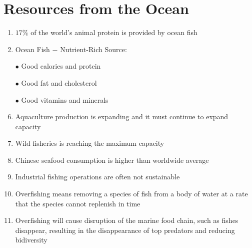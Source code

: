 \documentclass{report}
\begin{document}
\section{Resources from the Ocean}
\begin{enumerate}
    \item $17\%$ of the world's animal protein is provided by ocean fish
    \item Ocean Fish $-$ Nutrient-Rich Source:
    \item [$\bullet$]Good calories and protein
    \item [$\bullet$]Good fat and cholesterol
    \item [$\bullet$]Good vitamins and minerals
    \item Aquaculture production is expanding and it must continue to expand capacity
    \item Wild fisheries is reaching the maximum capacity
    \item Chinese seafood consumption is higher than worldwide average
    \item Industrial fishing operations are often not sustainable
    \item Overfishing means removing a species of fish from a body of water at a rate that the species cannot replenish in time
    \item Overfishing will cause disruption of the marine food chain, such as fishes disappear, resulting in the disappearance of top predators and reducing bidiversity
\end{enumerate}
\end{document}
